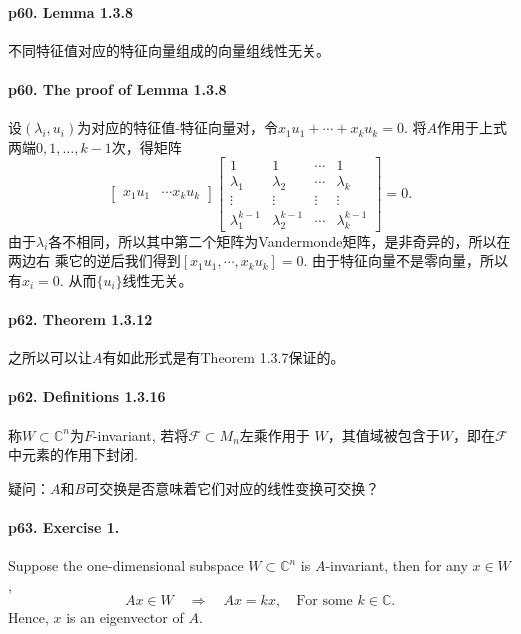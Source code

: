   \paragraph{p60. Lemma 1.3.8} 
    不同特征值对应的特征向量组成的向量组线性无关。
  \paragraph{p60. The proof of Lemma 1.3.8}
    设$(\lambda_i, u_i)$为对应的特征值-特征向量对，令$x_1u_1+\cdots+x_ku_k=0$.
    将$A$作用于上式两端$0,1,\dots,k-1$次，得矩阵
    \[
      \begin{bmatrix}
        x_1u_1 & \cdots x_ku_k
      \end{bmatrix}
      \begin{bmatrix}
        1          & 1 & \cdots & 1 \\
        \lambda_1  & \lambda_2 & \cdots & \lambda_k \\
        \vdots & \vdots & \vdots & \vdots \\
        \lambda_1^{k-1} & \lambda_2^{k-1} & \cdots & \lambda_k^{k-1}
      \end{bmatrix}
      =0.
    \]
    由于$\lambda_i$各不相同，所以其中第二个矩阵为Vandermonde矩阵，是非奇异的，所以在两边右
    乘它的逆后我们得到$[x_1u_1, \cdots, x_ku_k] = 0$. 由于特征向量不是零向量，所以有$x_i
    =0$. 从而$\{u_i\}$线性无关。

  \paragraph{p62. Theorem 1.3.12}
    之所以可以让$A$有如此形式是有Theorem 1.3.7保证的。

  \paragraph{p62. Definitions 1.3.16}
    称$W\subset\mathbb{C}^n$为$F$-invariant, 若将$\mathcal{F}\subset M_n$左乘作用于
    $W$，其值域被包含于$W$，即在$\mathcal{F}$中元素的作用下封闭. \par
    疑问：$A$和$B$可交换是否意味着它们对应的线性变换可交换？

  \paragraph{p63. Exercise 1.}
    Suppose the one-dimensional subspace $W \subset \mathbb{C}^n$ is 
    $A$-invariant, then for any $x\in W$, 
    \[
      Ax\in W \quad\Rightarrow\quad Ax=kx,\quad\text{For some $k\in\mathbb{C}$.}
    \]
    Hence, $x$ is an eigenvector of $A$.

